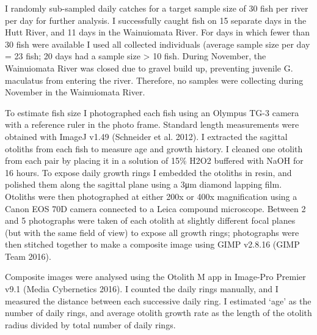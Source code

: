 \documentclass[]{book}
\begin{document}
I randomly sub-sampled daily catches for a target sample size of 30 fish
per river per day for further analysis. I successfully caught fish on 15
separate days in the Hutt River, and 11 days in the Wainuiomata River.
For days in which fewer than 30 fish were available I used all collected
individuals (average sample size per day = 23 fish; 20 days had a sample
size \textgreater{} 10 fish. During November, the Wainuiomata River was
closed due to gravel build up, preventing juvenile G. maculatus from
entering the river. Therefore, no samples were collecting during
November in the Wainuiomata River.

To estimate fish size I photographed each fish using an Olympus TG-3
camera with a reference ruler in the photo frame. Standard length
measurements were obtained with ImageJ v1.49 (Schneider et al. 2012). I
extracted the sagittal otoliths from each fish to measure age and growth
history. I cleaned one otolith from each pair by placing it in a
solution of 15\% H2O2 buffered with NaOH for 16 hours. To expose daily
growth rings I embedded the otoliths in resin, and polished them along
the sagittal plane using a 3μm diamond lapping film. Otoliths were then
photographed at either 200x or 400x magnification using a Canon EOS 70D
camera connected to a Leica compound microscope. Between 2 and 5
photographs were taken of each otolith at slightly different focal
planes (but with the same field of view) to expose all growth rings;
photographs were then stitched together to make a composite image using
GIMP v2.8.16 (GIMP Team 2016).

Composite images were analysed using the Otolith M app in Image-Pro
Premier v9.1 (Media Cybernetics 2016). I counted the daily rings
manually, and I measured the distance between each successive daily
ring. I estimated `age' as the number of daily rings, and average
otolith growth rate as the length of the otolith radius divided by total
number of daily rings.
\end{document}
